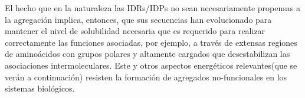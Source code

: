 El hecho que en la naturaleza las IDRs/IDPs no sean necesariamente propensas a la agregación implica, entonces, que sus secuencias han evolucionado para mantener el nivel de solubilidad necesaria que es requerido para 
realizar correctamente las funciones asociadas, por ejemplo, a través de extensas regiones de aminoácidos con grupos polares y altamente cargados que desestabilizan las asociaciones intermoleculares.
Este y otros aspectos energéticos relevantes(que se verán a continuación) resisten la formación de agregados no-funcionales en los sistemas biológicos.  














